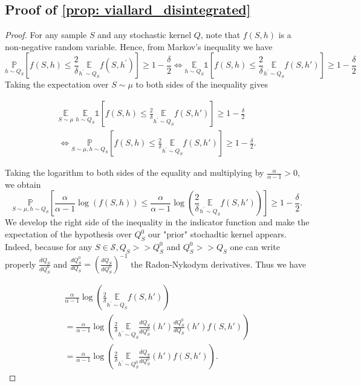 \subsection{Proof of \cref{prop: viallard_disintegrated} }


\begin{proof}[Proof]
 For any sample $S$ and any stochastic kernel $Q$, note that $f(S,h)$ is a non-negative random variable. Hence, from Markov's inequality we have
$$
\underset{h \sim Q_{S}}{\mathbb{P}}\left[f(S,h) \leq \frac{2}{\delta} \underset{h^{\prime} \sim Q_{S}}{\mathbb{E}} f\left( S,h^{\prime}\right)\right] \geq 1-\frac{\delta}{2} \Longleftrightarrow
\underset{h \sim Q_{S}}{\mathbb{E}} \mathds{1}\left[f(S,h) \leq \frac{2}{\delta} \underset{h^{\prime} \sim Q_{S}}{\mathbb{E}} f\left(S,h'\right)\right] \geq 1-\frac{\delta}{2}
$$
Taking the expectation over $S \sim \mu$ to both sides of the inequality gives

\begin{multline*}
\underset{S \sim \mu}{\mathbb{E}}\; \underset{h \sim Q_{S}}{\mathbb{E}} \mathds{1}\left[f(S,h) \leq \frac{2}{\delta} \underset{h^{\prime} \sim Q_{S}}{\mathbb{E}} f(S,h')\right] \geq 1-\frac{\delta}{2} \\
\Longleftrightarrow
\underset{S \sim \mu, h \sim Q_{S}}{\mathbb{P}}\left[f(S,h) \leq \frac{2}{\delta} \underset{h^{\prime} \sim Q_{S}}{\mathbb{E}} f(S,h')\right] \geq 1-\frac{\delta}{2}.
\end{multline*}

Taking the logarithm to both sides of the equality and multiplying by $\frac{\alpha}{\alpha-1}>0$, we obtain
$$
\underset{S \sim \mu, h \sim Q_{S}}{\mathbb{P}}\left[\frac{\alpha}{\alpha-1} \log (f(S,h)) \leq \frac{\alpha}{\alpha-1} \log \left(\frac{2}{\delta} \underset{h^{\prime} \sim Q_{S}}{\mathbb{E}} f(S,h')\right)\right] \geq 1-\frac{\delta}{2} .
$$
We develop the right side of the inequality in the indicator function and make the expectation of the hypothesis over $Q_S^0$ our "prior" stochadtic kernel appears. Indeed, because for any $S\in\mathcal{S}, Q_S>> Q_S^0$ and $Q_S^0>> Q_S$ one can write properly $\frac{dQ_S}{dQ_S^0}$ and $ \frac{dQ_S^0}{dQ_S} = \left( \frac{dQ_S}{dQ_S^0}\right)^{-1}$ the Radon-Nykodym derivatives. Thus we have

\begin{multline*}
 \frac{\alpha}{\alpha-1} \log \left(\frac{2}{\delta} \underset{h^{\prime} \sim Q_{S}}{\mathbb{E}} f(S,h')\right) \\ =\frac{\alpha}{\alpha-1} \log \left(\frac{2}{\delta} \underset{h^{\prime} \sim Q_{S}}{\mathbb{E}} \frac{dQ_S}{dQ_S^0}(h')\frac{dQ_S^0}{dQ_S}(h') f(S,h') \right) \\
 =\frac{\alpha}{\alpha-1} \log \left(\frac{2}{\delta} \underset{h^{\prime} \sim Q_S^0}{\mathbb{E}} \frac{dQ_S}{dQ_S^0}(h') f(S,h')\right) .
\end{multline*}


\end{proof}
